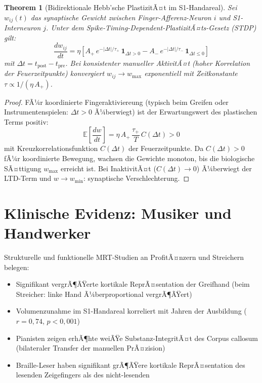 ﻿\documentclass[12pt,a4paper]{report}
\theoremstyle{plain}
\newtheorem{theorem}{Theorem}[section]
\theoremstyle{definition}
\theoremstyle{remark}
\begin{document}
\begin{theorem}[Bidirektionale Hebb'sche PlastizitÃ¤t im S1-Handareal]
\label{thm:stdp}
Sei $w_{ij}(t)$ das synaptische Gewicht zwischen Finger-Afferenz-Neuron $i$
und S1-Interneuron $j$. Unter dem Spike-Timing-Dependent-PlastizitÃ¤ts-Gesetz
(STDP) gilt:
\[
  \frac{dw_{ij}}{dt} = \eta\left[
    A_+\, e^{-|\Delta t|/\tau_+}\, \mathbf{1}_{\Delta t > 0}
    - A_-\, e^{-|\Delta t|/\tau_-}\, \mathbf{1}_{\Delta t \leq 0}
  \right]
\]
mit $\Delta t = t_{\text{post}} - t_{\text{pre}}$. Bei konsistenter
manueller AktivitÃ¤t (hoher Korrelation der Feuerzeitpunkte) konvergiert
$w_{ij} \to w_{\max}$ exponentiell mit Zeitkonstante $\tau \propto 1/(\eta\,A_+)$.
\end{theorem}

\begin{proof}
FÃ¼r koordinierte Fingeraktiviereung (typisch beim Greifen oder
Instrumentenspielen: $\Delta t > 0$ Ã¼berwiegt) ist der Erwartungswert
des plastischen Terms positiv:
\[
  \mathbb{E}\!\left[\frac{dw}{dt}\right]
  = \eta\,A_+\,\frac{\tau_+}{T}\, C(\Delta t) > 0
\]
mit Kreuzkorrelationsfunktion $C(\Delta t)$ der Feuerzeitpunkte.
Da $C(\Delta t) > 0$ fÃ¼r koordinierte Bewegung, wachsen die Gewichte
monoton, bis die biologische SÃ¤ttigung $w_{\max}$ erreicht ist.
Bei InaktivitÃ¤t ($C(\Delta t) \to 0$) Ã¼berwiegt der LTD-Term
und $w \to w_{\min}$: synaptische Verschlechterung.
\end{proof}

\section{Klinische Evidenz: Musiker und Handwerker}

Strukturelle und funktionelle MRT-Studien an ProfitÃ¤nzern \cite{haenggi2010}
und Streichern \cite{elbert1995} belegen:

\begin{itemize}
\item Signifikant vergrÃ¶ÃŸerte kortikale ReprÃ¤sentation der Greifhand
  (beim Streicher: linke Hand Ã¼berproportional vergrÃ¶ÃŸert)
\item Volumenzunahme im S1-Handareal korreliert mit Jahren der
  Ausbildung ($r = 0{,}74$, $p < 0{,}001$)
\item Pianisten zeigen erhÃ¶hte weiÃŸe Substanz-IntegritÃ¤t des
  Corpus callosum (bilateraler Transfer der manuellen PrÃ¤zision)
\item Braille-Leser haben signifikant grÃ¶ÃŸere kortikale ReprÃ¤sentation
  des lesenden Zeigefingers als des nicht-lesenden
\end{itemize}
\end{document}
